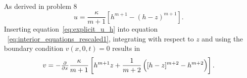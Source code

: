 As derived in problem 8
%
\begin{equation}
    u = \frac{\kappa}{m+1} \left[ h^{m+1} - (h-z)^{m+1} \right].
    \label{eq:explicit_u_h}
\end{equation}
%
Inserting equation~\eqref{eq:explicit_u_h} into equation ~\eqref{eq:interior_equations_rescaled1}, integrating with respect to $z$ and using the boundary condition $v(x,0,t) = 0$ results in
%
\begin{equation}
    v = - \pd{}{x} \frac{\kappa}{m+1} \left[ h^{m+1}z + \frac{1}{m+2} \left( [h-z]^{m+2} - h^{m+2} \right) \right].
    \label{eq:explicit_v_h}
\end{equation}
